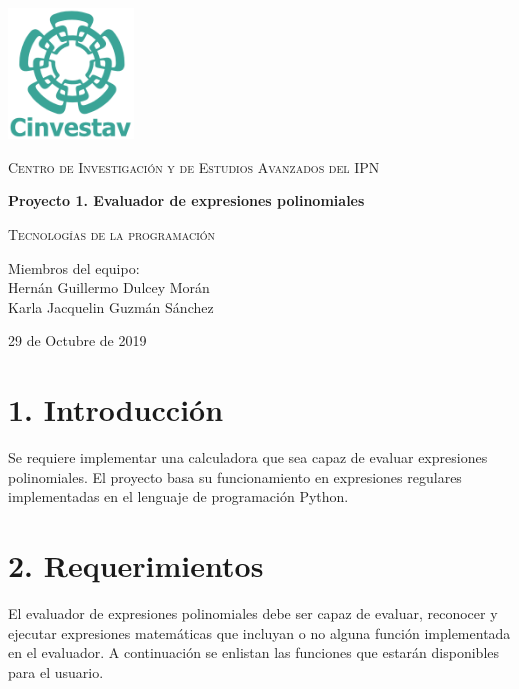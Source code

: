 \documentclass[10pt]{report}
\begin{document}
\begin{titlepage}
	\centering
	\includegraphics[width=0.25\textwidth]{LogoCinvesHeader.png}\par\vspace{2cm}
	{\scshape\LARGE Centro de Investigación y de Estudios Avanzados del IPN\par}
	\vspace{2cm}	
	{\huge\bfseries Proyecto 1. Evaluador de expresiones polinomiales \par}
	\vspace{1.5cm}
	{\scshape\Large Tecnologías de la programación\par}
	\vspace{2cm}
	{\Large Miembros del equipo: \\Hernán Guillermo Dulcey Morán \\Karla Jacquelin Guzmán Sánchez\par}
	\vfill

	{\large 29 de Octubre de 2019 \par}
\end{titlepage}

\section*{1. Introducción}
Se requiere implementar una calculadora que sea capaz de evaluar expresiones polinomiales. El proyecto basa su funcionamiento en expresiones regulares implementadas en el lenguaje de programación Python.

\section*{2. Requerimientos}
El evaluador de expresiones polinomiales debe ser capaz de evaluar, reconocer y ejecutar expresiones matemáticas que incluyan o no alguna función implementada en el evaluador. A continuación se enlistan las funciones que estarán disponibles para el usuario.
\end{document}
